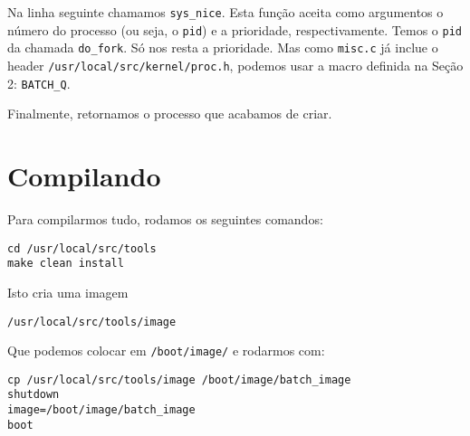 \documentclass{amsart}
\theoremstyle{plain}
\newcommand{\code}[1]{\lstinline[mathescape=true]{#1}}
\begin{document}
Na linha seguinte chamamos \code{sys_nice}. Esta função aceita como argumentos o número do processo
(ou seja, o \code{pid}) e a prioridade, respectivamente. Temos o \code{pid} da chamada
\code{do_fork}. Só nos resta a prioridade. Mas como \code{misc.c} já inclue o header
\code{/usr/local/src/kernel/proc.h}, podemos usar a macro definida na Seção 2: \code{BATCH_Q}.

Finalmente, retornamos o processo que acabamos de criar.

\section{Compilando}

Para compilarmos tudo, rodamos os seguintes comandos:

\begin{lstlisting}[frame=leftline,mathescape=true,style=nonumbers]
cd /usr/local/src/tools
make clean install
\end{lstlisting}

Isto cria uma imagem

\begin{lstlisting}[frame=leftline,mathescape=true,style=nonumbers]
/usr/local/src/tools/image
\end{lstlisting}

Que podemos colocar em \code{/boot/image/} e rodarmos com:

\begin{lstlisting}[frame=leftline,mathescape=true,style=nonumbers]
cp /usr/local/src/tools/image /boot/image/batch_image
shutdown
image=/boot/image/batch_image
boot
\end{lstlisting}
\end{document}
